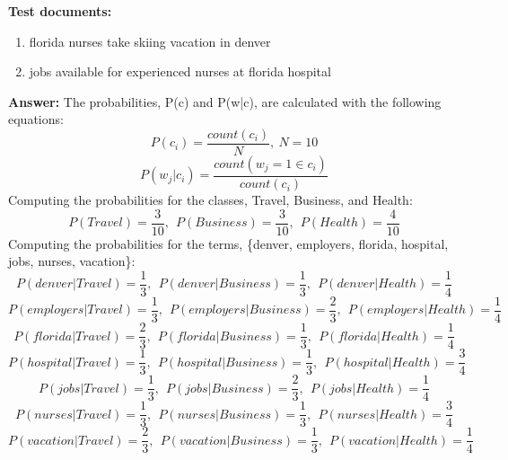 \documentclass[11pt]{article}
\begin{document}
\begin{enumerate}
        \textbf{Test documents:}
        \begin{enumerate}
            \item florida nurses take skiing vacation in denver
            \item jobs available for experienced nurses at florida hospital
        \end{enumerate}

        \textbf{Answer:} The probabilities, P(c) and P(w|c), are calculated with the following equations:
        \begin{equation*}
            P(c_i) = \frac{count(c_i)}{N}, \ N=10
        \end{equation*}
        \begin{equation*}
            P(w_j | c_i) = \frac{count(w_j=1 \in c_i)}{count(c_i)}
        \end{equation*}
        Computing the probabilities for the classes, Travel, Business, and Health:
        \begin{equation*}
            P(Travel) = \frac{3}{10}, \ \
            P(Business) = \frac{3}{10}, \ \
            P(Health) = \frac{4}{10}
        \end{equation*}
        Computing the probabilities for the terms, \{denver, employers, florida, hospital, jobs, nurses, vacation\}:
        \begin{equation*}
            P(denver | Travel) = \frac{1}{3}, \ \
            P(denver | Business) = \frac{1}{3}, \ \
            P(denver | Health) = \frac{1}{4}
        \end{equation*}
        \begin{equation*}
            P(employers | Travel) = \frac{1}{3}, \ \
            P(employers | Business) = \frac{2}{3}, \ \
            P(employers | Health) = \frac{1}{4}
        \end{equation*}
        \begin{equation*}
            P(florida | Travel) = \frac{2}{3}, \ \
            P(florida | Business) = \frac{1}{3}, \ \
            P(florida | Health) = \frac{1}{4}
        \end{equation*}
        \begin{equation*}
            P(hospital | Travel) = \frac{1}{3}, \ \
            P(hospital | Business) = \frac{1}{3}, \ \
            P(hospital | Health) = \frac{3}{4}
        \end{equation*}
        \begin{equation*}
            P(jobs | Travel) = \frac{1}{3}, \ \
            P(jobs | Business) = \frac{2}{3}, \ \
            P(jobs | Health) = \frac{1}{4}
        \end{equation*}
        \begin{equation*}
            P(nurses | Travel) = \frac{1}{3}, \ \
            P(nurses | Business) = \frac{1}{3}, \ \
            P(nurses | Health) = \frac{3}{4}
        \end{equation*}
        \begin{equation*}
            P(vacation | Travel) = \frac{2}{3}, \ \
            P(vacation | Business) = \frac{1}{3}, \ \
            P(vacation | Health) = \frac{1}{4}
        \end{equation*}


\end{enumerate}
\end{document}
